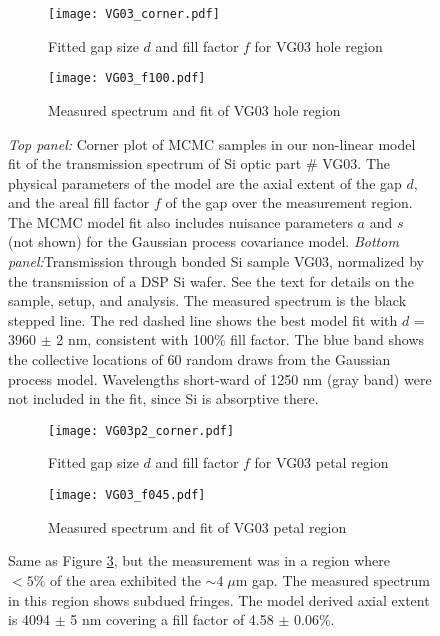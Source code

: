 \documentclass[osajnl,twocolumn,showpacs,superscriptaddress,11pt]{revtex4-1} %
\begin{document}
\begin{figure}[!htbp]
        \centering
        \begin{subfigure}[b]{0.5\textwidth}
              \texttt{[image: VG03\_corner.pdf]}
              \caption{Fitted gap size $d$ and fill factor $f$ for VG03 hole region}
		\label{figVG03_corner}
        \end{subfigure}

        \begin{subfigure}[b]{0.5\textwidth}
                \texttt{[image: VG03\_f100.pdf]}
                \caption{Measured spectrum and fit of VG03 hole region}
                \label{figVG03_f100}
        \end{subfigure}
\caption{ \emph{Top panel:} Corner plot of MCMC samples in our non-linear model fit of the transmission spectrum of Si optic part \# VG03.  The physical parameters of the model are the axial extent of the gap $d$, and the areal fill factor $f$ of the gap over the measurement region.  The MCMC model fit also includes nuisance parameters $a$ and $s$ (not shown) for the Gaussian process covariance model.  \emph{Bottom panel:}Transmission through bonded Si sample VG03, normalized by the transmission of a DSP Si wafer. See the text for details on the sample, setup, and analysis.  The measured spectrum is the black stepped line.  The red dashed line shows the best model fit with $d$ = 3960 $\pm$ 2 nm, consistent with 100\% fill factor.  The blue band shows the collective locations of 60 random draws from the Gaussian process model.  Wavelengths short-ward of 1250 nm (gray band) were not included in the fit, since Si is absorptive there.\label{figVG03full} }
\end{figure}


\begin{figure}[!htbp]
        \centering
        \begin{subfigure}[b]{0.5\textwidth}
              \texttt{[image: VG03p2\_corner.pdf]}
              \caption{Fitted gap size $d$ and fill factor $f$ for VG03 petal region}
		\label{figVG03p2_corner}
        \end{subfigure}

        \begin{subfigure}[b]{0.5\textwidth}
                \texttt{[image: VG03\_f045.pdf]}
                \caption{Measured spectrum and fit of VG03 petal region}
                \label{figVG03_f045}
        \end{subfigure}
\caption{ Same as Figure \ref{figVG03full}, but the measurement was in a region where $<5\%$ of the area exhibited the $\sim4\; \mu$m gap.  The measured spectrum in this region shows subdued fringes. The model derived axial extent is 4094 $\pm$ 5 nm covering a fill factor of 4.58 $\pm$ 0.06$\%$. \label{figVG03part}}
\end{figure}
\end{document}
